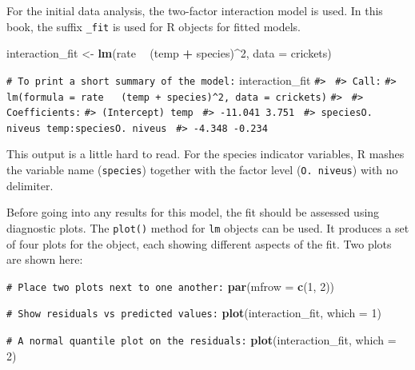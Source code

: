 \documentclass[11pt]{book}
\newenvironment{Shaded}{\begin{snugshade}}{\end{snugshade}}
\newcommand{\CommentTok}[1]{\textcolor[rgb]{0.56,0.35,0.01}{\textit{#1}}}
\newcommand{\DataTypeTok}[1]{\textcolor[rgb]{0.13,0.29,0.53}{#1}}
\newcommand{\DecValTok}[1]{\textcolor[rgb]{0.00,0.00,0.81}{#1}}
\newcommand{\KeywordTok}[1]{\textcolor[rgb]{0.13,0.29,0.53}{\textbf{#1}}}
\newcommand{\NormalTok}[1]{#1}
\newcommand{\OperatorTok}[1]{\textcolor[rgb]{0.81,0.36,0.00}{\textbf{#1}}}
\newcommand{\StringTok}[1]{\textcolor[rgb]{0.31,0.60,0.02}{#1}}
\renewcommand{\CommentTok}[1]{\textcolor[rgb]{0.41,0.41,0.41}{\texttt{#1}}}
\begin{document}
For the initial data analysis, the two-factor interaction model is used. In this book, the suffix \texttt{\_fit} is used for R objects for fitted models.

\begin{Shaded}
\begin{Highlighting}[]
\NormalTok{interaction_fit <-}\StringTok{  }\KeywordTok{lm}\NormalTok{(rate }\OperatorTok{~}\StringTok{ }\NormalTok{(temp }\OperatorTok{+}\StringTok{ }\NormalTok{species)}\OperatorTok{^}\DecValTok{2}\NormalTok{, }\DataTypeTok{data =}\NormalTok{ crickets) }

\CommentTok{# To print a short summary of the model:}
\NormalTok{interaction_fit}
\CommentTok{#> }
\CommentTok{#> Call:}
\CommentTok{#> lm(formula = rate ~ (temp + species)^2, data = crickets)}
\CommentTok{#> }
\CommentTok{#> Coefficients:}
\CommentTok{#>           (Intercept)                   temp  }
\CommentTok{#>               -11.041                  3.751  }
\CommentTok{#>      speciesO. niveus  temp:speciesO. niveus  }
\CommentTok{#>                -4.348                 -0.234}
\end{Highlighting}
\end{Shaded}

This output is a little hard to read. For the species indicator variables, R mashes the variable name (\texttt{species}) together with the factor level (\texttt{O.\ niveus}) with no delimiter.

Before going into any results for this model, the fit should be assessed using diagnostic plots. The \texttt{plot()} method for \texttt{lm} objects can be used. It produces a set of four plots for the object, each showing different aspects of the fit. Two plots are shown here:

\begin{Shaded}
\begin{Highlighting}[]
\CommentTok{# Place two plots next to one another:}
\KeywordTok{par}\NormalTok{(}\DataTypeTok{mfrow =} \KeywordTok{c}\NormalTok{(}\DecValTok{1}\NormalTok{, }\DecValTok{2}\NormalTok{))}

\CommentTok{# Show residuals vs predicted values:}
\KeywordTok{plot}\NormalTok{(interaction_fit, }\DataTypeTok{which =} \DecValTok{1}\NormalTok{)}

\CommentTok{# A normal quantile plot on the residuals:}
\KeywordTok{plot}\NormalTok{(interaction_fit, }\DataTypeTok{which =} \DecValTok{2}\NormalTok{)}
\end{Highlighting}
\end{Shaded}
\end{document}
